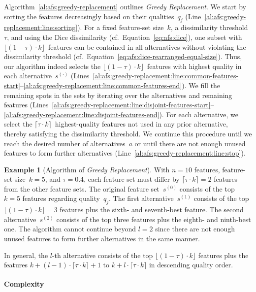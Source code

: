 \documentclass{article}
\theoremstyle{definition}
\newtheorem{example}{Example}
\begin{document}
Algorithm~\ref{al:afs:greedy-replacement} outlines \emph{Greedy Replacement}.
We start by sorting the features decreasingly based on their qualities~$q_j$ (Line~\ref{al:afs:greedy-replacement:line:sorting}).
For a fixed feature-set size~$k$, a dissimilarity threshold~$\tau$, and using the Dice dissimilarity (cf.~Equation~\ref{eq:afs:dice}), one subset with $\lfloor (1 - \tau) \cdot k \rfloor$~features can be contained in all alternatives without violating the dissimilarity threshold (cf.~Equation~\ref{eq:afs:dice-rearranged-equal-size}).
Thus, our algorithm indeed selects the $\lfloor (1 - \tau) \cdot k \rfloor$~features with highest quality in each alternative~$s^{(\cdot)}$ (Lines~\ref{al:afs:greedy-replacement:line:common-features-start}--\ref{al:afs:greedy-replacement:line:common-features-end}).
We fill the remaining spots in the sets by iterating over the alternatives and remaining features (Lines~\ref{al:afs:greedy-replacement:line:disjoint-features-start}--\ref{al:afs:greedy-replacement:line:disjoint-features-end}).
For each alternative, we select the $\lceil \tau \cdot k \rceil$~highest-quality features not used in any prior alternative, thereby satisfying the dissimilarity threshold.
We continue this procedure until we reach the desired number of alternatives~$a$ or until there are not enough unused features to form further alternatives (Line~\ref{al:afs:greedy-replacement:line:stop}).
%
\begin{example}[Algorithm of \emph{Greedy Replacement}]
	With $n=10$ features, feature-set size~$k=5$, and $\tau=0.4$, each feature set must differ by $\lceil \tau \cdot k \rceil = 2$ features from the other feature sets.
	The original feature set~$s^{(0)}$ consists of the top $k=5$ features regarding quality~$q_j$.
	The first alternative~$s^{(1)}$ consists of the top $\lfloor (1 - \tau) \cdot k \rfloor = 3$ features plus the sixth- and seventh-best feature.
	The second alternative~$s^{(2)}$ consists of the top three features plus the eighth- and ninth-best one.
	The algorithm cannot continue beyond $l=2$ since there are not enough unused features to form further alternatives in the same manner.
	\label{ex:afs:greedy-replacement:algorithm}
\end{example}
%
In general, the $l$-th alternative consists of the top $\lfloor (1 - \tau) \cdot k \rfloor$ features plus the features $k + (l-1) \cdot \lceil \tau \cdot k \rceil + 1$ to $k + l \cdot \lceil \tau \cdot k \rceil$ in descending quality order.

\paragraph{Complexity}
\end{document}
